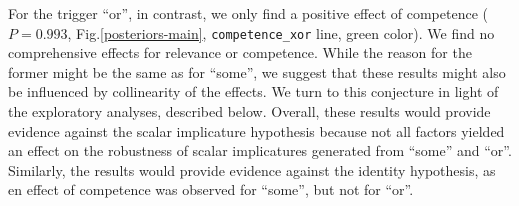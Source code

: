\documentclass{sp}
\begin{document}
For the trigger ``or'', in contrast, we only find a positive effect of competence ($P =  0.993$, Fig.\ref{posteriors-main}, \texttt{competence\_xor} line, green color).  We find no comprehensive effects for relevance or competence. While the reason for the former might be the same as for ``some'', we suggest that these results might also be influenced by collinearity of the effects. We turn to this conjecture in light of the exploratory analyses, described below. 
Overall, these results would provide evidence against the scalar implicature hypothesis because not all factors yielded an effect on the robustness of scalar implicatures generated from ``some'' and ``or''. Similarly, the results would provide evidence against the identity hypothesis, as en effect of competence was observed for ``some'', but not for ``or''. 
\end{document}
